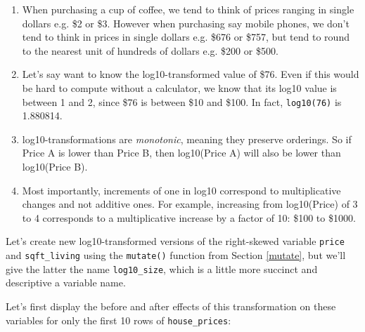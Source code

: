 \documentclass[12pt,]{krantz}
\makeatletter
\newenvironment{Shaded}{\begin{snugshade}}{\end{snugshade}}
\newcommand{\KeywordTok}[1]{\textcolor[rgb]{0.27,0.27,0.27}{\textbf{#1}}}
\newcommand{\DataTypeTok}[1]{\textcolor[rgb]{0.27,0.27,0.27}{#1}}
\newcommand{\StringTok}[1]{\textcolor[rgb]{0.5,0.5,0.5}{#1}}
\newcommand{\OperatorTok}[1]{\textcolor[rgb]{0.43,0.43,0.43}{\textbf{#1}}}
\newcommand{\NormalTok}[1]{#1}
\providecommand{\tightlist}{%
  \setlength{\itemsep}{0pt}\setlength{\parskip}{0pt}}
\newenvironment{kframe}{%
\medskip{}
\setlength{\fboxsep}{.8em}
 \def\at@end@of@kframe{}%
 \ifinner\ifhmode%
  \def\at@end@of@kframe{\end{minipage}}%
  \begin{minipage}{\columnwidth}%
 \fi\fi%
 \def\FrameCommand##1{\hskip\@totalleftmargin \hskip-\fboxsep
 \colorbox{shadecolor}{##1}\hskip-\fboxsep
     \hskip-\linewidth \hskip-\@totalleftmargin \hskip\columnwidth}%
 \MakeFramed {\advance\hsize-\width
   \@totalleftmargin\z@ \linewidth\hsize
   \@setminipage}}%
 {\par\unskip\endMakeFramed%
 \at@end@of@kframe}
\renewenvironment{Shaded}{\begin{kframe}}{\end{kframe}}
\theoremstyle{definition}
\theoremstyle{definition}
\theoremstyle{definition}
\theoremstyle{remark}
\makeatother
\begin{document}
\begin{enumerate}
\def\labelenumi{\arabic{enumi}.}
\tightlist
\item
  When purchasing a cup of coffee, we tend to think of prices ranging in
  single dollars e.g. \$2 or \$3. However when purchasing say mobile
  phones, we don't tend to think in prices in single dollars e.g. \$676
  or \$757, but tend to round to the nearest unit of hundreds of dollars
  e.g. \$200 or \$500.
\item
  Let's say want to know the log10-transformed value of \$76. Even if
  this would be hard to compute without a calculator, we know that its
  log10 value is between 1 and 2, since \$76 is between \$10 and \$100.
  In fact, \texttt{log10(76)} is 1.880814.
\item
  log10-transformations are \emph{monotonic}, meaning they preserve
  orderings. So if Price A is lower than Price B, then log10(Price A)
  will also be lower than log10(Price B).
\item
  Most importantly, increments of one in log10 correspond to
  multiplicative changes and not additive ones. For example, increasing
  from log10(Price) of 3 to 4 corresponds to a multiplicative increase
  by a factor of 10: \$100 to \$1000.
\end{enumerate}

Let's create new log10-transformed versions of the right-skewed variable
\texttt{price} and \texttt{sqft\_living} using the \texttt{mutate()}
function from Section \ref{mutate}, but we'll give the latter the name
\texttt{log10\_size}, which is a little more succinct and descriptive a
variable name.

\begin{Shaded}
\end{Shaded}

Let's first display the before and after effects of this transformation
on these variables for only the first 10 rows of \texttt{house\_prices}:

\begin{Shaded}
\end{Shaded}
\end{document}
